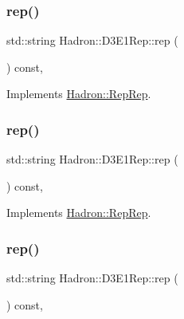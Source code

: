 \subsubsection{\texorpdfstring{rep()}{rep()}\hspace{0.1cm}{\footnotesize\ttfamily [3/5]}}
{\footnotesize\ttfamily std\+::string Hadron\+::\+D3\+E1\+Rep\+::rep (\begin{DoxyParamCaption}{ }\end{DoxyParamCaption}) const\hspace{0.3cm}{\ttfamily [inline]}, {\ttfamily [virtual]}}



Implements \mbox{\hyperlink{structHadron_1_1RepRep_ab3213025f6de249f7095892109575fde}{Hadron\+::\+Rep\+Rep}}.

\mbox{\label{structHadron_1_1D3E1Rep_a31b989d15d93cd4e876bfabd809b84ee}} 
\subsubsection{\texorpdfstring{rep()}{rep()}\hspace{0.1cm}{\footnotesize\ttfamily [4/5]}}
{\footnotesize\ttfamily std\+::string Hadron\+::\+D3\+E1\+Rep\+::rep (\begin{DoxyParamCaption}{ }\end{DoxyParamCaption}) const\hspace{0.3cm}{\ttfamily [inline]}, {\ttfamily [virtual]}}



Implements \mbox{\hyperlink{structHadron_1_1RepRep_ab3213025f6de249f7095892109575fde}{Hadron\+::\+Rep\+Rep}}.

\mbox{\label{structHadron_1_1D3E1Rep_a31b989d15d93cd4e876bfabd809b84ee}} 
\subsubsection{\texorpdfstring{rep()}{rep()}\hspace{0.1cm}{\footnotesize\ttfamily [5/5]}}
{\footnotesize\ttfamily std\+::string Hadron\+::\+D3\+E1\+Rep\+::rep (\begin{DoxyParamCaption}{ }\end{DoxyParamCaption}) const\hspace{0.3cm}{\ttfamily [inline]}, {\ttfamily [virtual]}}



